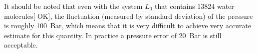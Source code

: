 \documentclass[a4paper,preprint,unsortedaddress,onecolumn,fleqn]{revtex4}
\newcommand{\eps}{\varepsilon}
\newcommand{\systemmb}{M_1}
\newcommand{\systemlb}{L_1}
\begin{document}
{\color{red} It should be noted that even with the system $L_{0}$ that
contains 13824 water molecules[} {\color{blue} OK}], the fluctuation
(measured by standard deviation) of the pressure is roughly 100~Bar, which
means that it is very difficult to achieve very accurate estimate for this
quantity. In practice a pressure error of 20~Bar is still acceptable.

\end{document}
